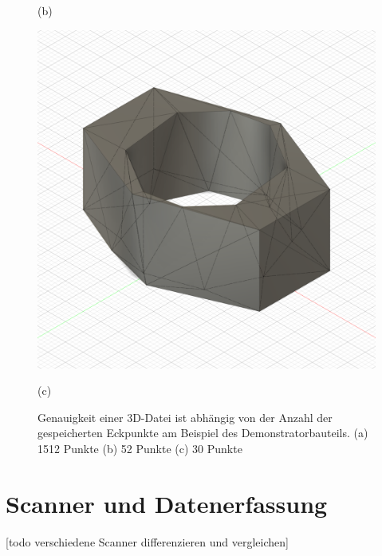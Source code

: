 \begin{figure}[h]
\begin{minipage}{0.32\textwidth}
        \caption*{(b)}
    \end{minipage}\hfill
    \begin{minipage}{0.32\textwidth}
        \centering
        \includegraphics[width=\linewidth]{images/image_demo_low.PNG} %
        \caption*{(c)}
    \end{minipage}\hfill

    \caption{Genauigkeit einer 3D-Datei ist abhängig von der Anzahl der gespeicherten
    Eckpunkte am Beispiel des Demonstratorbauteils. (a) 1512 Punkte
    (b) 52 Punkte (c) 30 Punkte}
    \label{fig:3d_design}
\end{figure}

\section{Scanner und Datenerfassung}
[todo verschiedene Scanner differenzieren und vergleichen]

